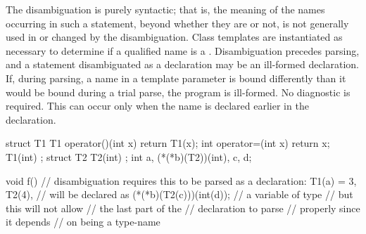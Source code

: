 \pnum
The disambiguation is purely syntactic; that is, the meaning of the
names occurring in such a statement, beyond whether they are
 or not, is not generally used in or changed by the
disambiguation. Class templates are instantiated as necessary to
determine if a qualified name is a . Disambiguation
precedes parsing, and a statement disambiguated as a declaration may be
an ill-formed declaration. If, during parsing, a name in a template
parameter is bound differently than it would be bound during a trial
parse, the program is ill-formed. No diagnostic is required.
\enternote
This can occur only when the name is declared earlier in the
declaration.
\exitnote
\enterexample

\begin{codeblock}
struct T1 {
  T1 operator()(int x) { return T1(x); }
  int operator=(int x) { return x; }
  T1(int) { }
};
struct T2 { T2(int){ } };
int a, (*(*b)(T2))(int), c, d;

void f() {
  // disambiguation requires this to be parsed as a declaration:
  T1(a) = 3,
  T2(4),                        //  will be declared as
  (*(*b)(T2(c)))(int(d));       // a variable of type 
                                // but this will not allow
                                // the last part of the
                                // declaration to parse
                                // properly since it depends
                                // on  being a type-name
}
\end{codeblock}
\exitexample%
